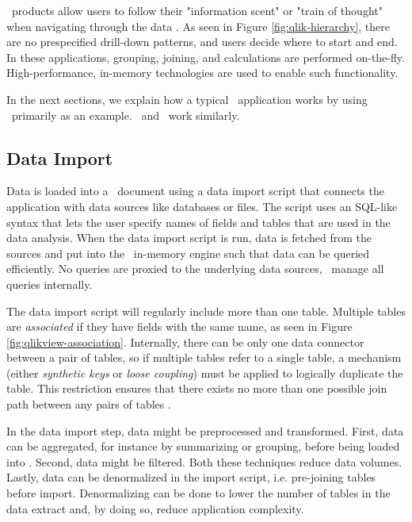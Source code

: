 \bd~products allow users to follow their "information scent" or "train of thought" when navigating through the data \cite{Kamkolkar2015-iq, Qlik2014-vd}. As seen in Figure \ref{fig:qlik-hierarchy}, there are no prespecified drill-down patterns, and users decide where to start and end. In these applications, grouping, joining, and calculations are performed on-the-fly. High-performance, in-memory technologies are used to enable such functionality. 

In the next sections, we explain how a typical \bd~application works by using \qlikview~primarily as an example. \tableau~and \powerpivot~work similarly.

\subsection{Data Import}
\label{sub:Data Import}
Data is loaded into a \qlikview~document using a data import script that connects the application with data sources like databases or files. The script uses an SQL-like syntax that lets the user specify names of fields and tables that are used in the data analysis. When the data import script is run, data is fetched from the sources and put into the \qlikview~in-memory engine such that data can be queried efficiently. No queries are proxied to the underlying data sources, \qlikview~manage all queries internally.


The data import script will regularly include more than one table. Multiple tables are \textit{associated} if they have fields with the same name, as seen in Figure \ref{fig:qlikview-association}. Internally, there can be only one data connector between a pair of tables, so if multiple tables refer to a single table, a mechanism (either \textit{synthetic keys} or \textit{loose coupling}) must be applied to logically duplicate the table. This restriction ensures that there exists no more than one possible join path between any pairs of tables \cite{noauthor_undated-js}.

In the data import step, data might be preprocessed and transformed. First, data can be aggregated, for instance by summarizing or grouping, before being loaded into \qlikview. Second, data might be filtered. Both these techniques reduce data volumes. Lastly, data can be denormalized in the import script, i.e. pre-joining tables before import. Denormalizing can be done to lower the number of tables in the data extract and, by doing so, reduce application complexity.

